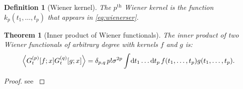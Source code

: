 \documentclass[12pt]{article}
\theoremstyle{slplain}
\newtheorem{thm}{Theorem}
\theoremstyle{sldefinition}
\newtheorem{defn}{Definition}
\theoremstyle{remark}
\begin{document}
\begin{defn}[Wiener kernel]
  The $p^{\text{th}}$ Wiener kernel is the function $k_p(t_1,\ldots,t_p)$ that appears in \eqref{eq:wienerser}.
\end{defn}

\begin{thm}[Inner product of Wiener functionals]
  The inner product of two Wiener functionals of arbitrary degree with kernels $f$ and $g$ is:
  \begin{equation}\label{eq:wienerinner}
    \left\langle G^{(p)}_t[f;x] G^{(q)}_t[g;x] \right\rangle = \delta_{p,q}\, p! \sigma^{2p} \int\!\mathrm{d} t_1\ldots \mathrm{d} t_p\, f(t_1,\ldots,t_p) g(t_1,\ldots,t_p).
  \end{equation}
\end{thm}
\begin{proof}
  see \cite[\S14.2]{schetzen:1980}
\end{proof}
\end{document}
